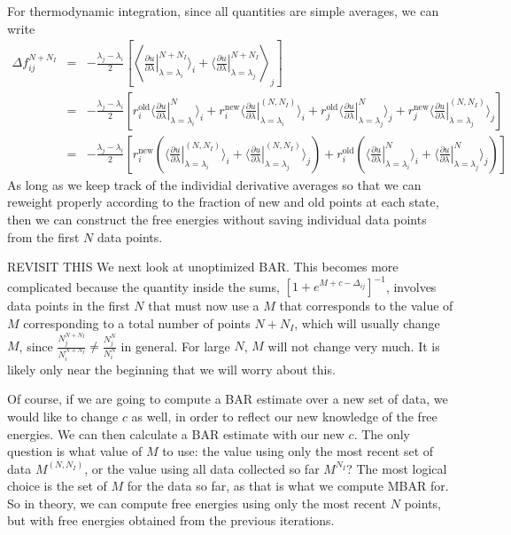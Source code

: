 \documentclass[superscriptaddress,showkeys, nofootinbib, pre, aps]{revtex4-1}
\newcommand{\dudl}[1]{\left.\frac{\partial u}{\partial \lambda}\right|_{\lambda=\lambda_{#1}}}
\newcommand{\ro}[1]{r_{#1}^{\mathrm{old}}}
\newcommand{\rn}[1]{r_{#1}^{\mathrm{new}}}
\begin{document}
For thermodynamic integration, since all quantities are simple
averages, we can write
\begin{eqnarray*}
\Delta f_{ij}^{N+N_I} &=& -\frac{\lambda_j-\lambda_i}{2}\left[\left\langle \dudl{i}^{N+N_I} \rangle_i + \langle \dudl{j}^{N+N_I} \right\rangle_j \right] \\
                      &=& -\frac{\lambda_j-\lambda_i}{2}\left[\ro{i} \langle \dudl{i}^{N}\rangle_i + \rn{i}\langle \dudl{i}^{(N,N_I)}\rangle_i + \ro{j}\langle \dudl{j}^{N} \rangle_j + \rn{j}\langle \dudl{j}^{(N,N_I)}  \rangle_j \right] \\
                      &=& -\frac{\lambda_j-\lambda_i}{2}\left[ \rn{i}\left(\langle\dudl{i}^{(N,N_I)}\rangle_i + \langle \dudl{j}^{(N,N_I)}\rangle_j\right)
                      + \ro{i} \left( \langle \dudl{i}^{N}\rangle_i + \langle \dudl{j}^{N} \rangle_j \right) \right]
\end{eqnarray*}
As long as we keep track of the individial derivative averages so that we can reweight properly according to the fraction of new and old points at each state, then we can construct the free energies without saving individual data points from the first $N$ data points.

{\color{red}REVISIT THIS} We next look at unoptimized BAR.  This becomes more complicated because the quantity inside the sums, $[1+e^{M+c-\Delta_{ij}}]^{-1}$,
  involves data points in the first $N$ that must now use a $M$ that
  corresponds to the value of $M$ corresponding to a total number of
  points $N + N_I$, which will usually change $M$, since
  $\frac{N_j^{N+N_I}}{N_i^{N+N_I}} \ne \frac{N_j^N}{N_i^N}$ in
  general.  For large $N$, $M$ will not change very much. It is likely
  only near the beginning that we will worry about this.

Of course, if we are going to compute a BAR estimate over a new set of data, we would like to change $c$ as well, in order to reflect our new knowledge of the free energies. We can then calculate a BAR estimate with our new $c$.  The only question is what value of $M$ to
use: the value using only the most recent set of data $M^{(N,N_I)}$, or the value using all data collected so far $M^{N_I}$?  The most logical choice is the set of $M$ for the data so far, as that is what we compute MBAR for. So in theory, we can compute free energies using only the most recent $N$ points, but with free energies obtained from the previous iterations.

\end{document}
